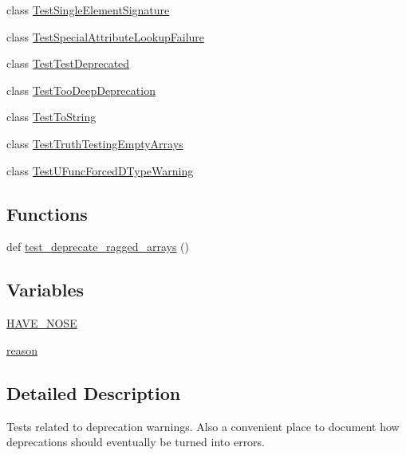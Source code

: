 \begin{DoxyCompactItemize}
\item 
class \hyperlink{classnumpy_1_1core_1_1tests_1_1test__deprecations_1_1TestSingleElementSignature}{Test\+Single\+Element\+Signature}
\item 
class \hyperlink{classnumpy_1_1core_1_1tests_1_1test__deprecations_1_1TestSpecialAttributeLookupFailure}{Test\+Special\+Attribute\+Lookup\+Failure}
\item 
class \hyperlink{classnumpy_1_1core_1_1tests_1_1test__deprecations_1_1TestTestDeprecated}{Test\+Test\+Deprecated}
\item 
class \hyperlink{classnumpy_1_1core_1_1tests_1_1test__deprecations_1_1TestTooDeepDeprecation}{Test\+Too\+Deep\+Deprecation}
\item 
class \hyperlink{classnumpy_1_1core_1_1tests_1_1test__deprecations_1_1TestToString}{Test\+To\+String}
\item 
class \hyperlink{classnumpy_1_1core_1_1tests_1_1test__deprecations_1_1TestTruthTestingEmptyArrays}{Test\+Truth\+Testing\+Empty\+Arrays}
\item 
class \hyperlink{classnumpy_1_1core_1_1tests_1_1test__deprecations_1_1TestUFuncForcedDTypeWarning}{Test\+U\+Func\+Forced\+D\+Type\+Warning}
\end{DoxyCompactItemize}
\subsection*{Functions}
\begin{DoxyCompactItemize}
\item 
def \hyperlink{namespacenumpy_1_1core_1_1tests_1_1test__deprecations_a3a1d2498f33699915d61333b2b520b36}{test\+\_\+deprecate\+\_\+ragged\+\_\+arrays} ()
\end{DoxyCompactItemize}
\subsection*{Variables}
\begin{DoxyCompactItemize}
\item 
\hyperlink{namespacenumpy_1_1core_1_1tests_1_1test__deprecations_a4c9f918f643540801d297015bf9af24d}{H\+A\+V\+E\+\_\+\+N\+O\+SE}
\item 
\hyperlink{namespacenumpy_1_1core_1_1tests_1_1test__deprecations_a4f27db08b14dfea0c330cc8ecc7e9394}{reason}
\end{DoxyCompactItemize}


\subsection{Detailed Description}
\begin{DoxyVerb}Tests related to deprecation warnings. Also a convenient place
to document how deprecations should eventually be turned into errors.\end{DoxyVerb}
 

